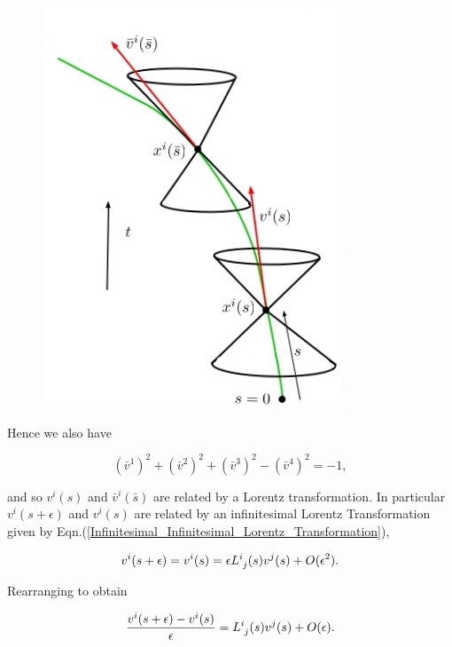 \begin{figure}[h!]
\begin{center}
\caption{\textit{}}
\label{Infinitesimal_Fig_Steps_Along_Minkowskian}
\includegraphics[scale=0.8]{figs/5_4.jpg}
\end{center}
\end{figure}

Hence we also have

\begin{equation*}
({\bar{v}^1})^2  + ({\bar{v}^2})^2 + ({\bar{v}^3})^2  - ({\bar{v}^4})^2 = -1,
\end{equation*}

\noindent and so $v^i(s)$ and $\bar{v}^i(\bar{s})$ are related by a Lorentz transformation. In particular $v^i(s+\epsilon)$ and $v^i(s)$ are related by an infinitesimal Lorentz Transformation given by Eqn.(\ref{Infinitesimal_Infinitesimal_Lorentz_Transformation}),

\begin{equation}
v^i(s+\epsilon) = v^i(s) = \epsilon \tensor{L}{^{i}_{j}}(s)v^j (s) + O(\epsilon^2).
\end{equation}

\noindent Rearranging to obtain

\begin{equation}
\frac{v^i(s+\epsilon) - v^i(s)}{\epsilon} = \tensor{L}{^{i}_{j}}(s)v^j (s) + O(\epsilon).
\end{equation}

